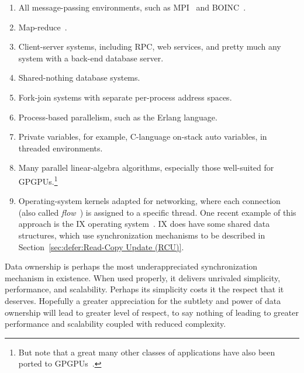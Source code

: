 \begin{enumerate}
\item	All message-passing environments, such as MPI~\cite{MPIForum2008}
	and BOINC~\cite{BOINC2008}.
\item	Map-reduce~\cite{MapReduce2008MIT}.
\item	Client-server systems, including RPC, web services, and
	pretty much any system with a back-end database server.
\item	Shared-nothing database systems.
\item	Fork-join systems with separate per-process address spaces.
\item	Process-based parallelism, such as the Erlang language.
\item	Private variables, for example, C-language on-stack auto variables,
	in threaded environments.
\item	Many parallel linear-algebra algorithms, especially those
	well-suited for GPGPUs.\footnote{
		But note that a great many other classes of applications
		have also been ported to
		GPGPUs~\cite{NormMatloff2017ParProcBook,AMD2020ROCm,NVidia2017GPGPU,NVidia2017GPGPU-university}.}
\item	Operating-system kernels adapted for networking, where each connection
	(also called \emph{flow}~\cite{Shenker89,ZhangPhD,McKenney90})
	is assigned to a specific thread.
	One recent example of this approach is the IX operating
	system~\cite{Belay:2016:IOS:3014162.2997641}.
	IX does have some shared data structures, which use synchronization
	mechanisms to be described in
	Section~\ref{sec:defer:Read-Copy Update (RCU)}.
\end{enumerate}

Data ownership is perhaps the most underappreciated synchronization
mechanism in existence.
When used properly, it delivers unrivaled simplicity, performance,
and scalability.
Perhaps its simplicity costs it the respect that it deserves.
Hopefully a greater appreciation for the subtlety and power of data ownership
will lead to greater level of respect, to say nothing of leading to
greater performance and scalability coupled with reduced complexity.


